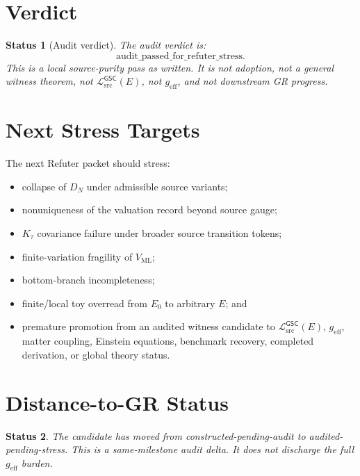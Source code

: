 \documentclass[11pt]{article}
\newcommand{\MetricData}{\mathcal{L}_{\mathrm{src}}^{\mathsf{GSC}}}
\newcommand{\geff}{g_{\mathrm{eff}}}
\newcommand{\Ezero}{E_{0}}
\newtheorem{status}{Status}
\begin{document}
\section{Verdict}

\begin{status}[Audit verdict]
The audit verdict is:
\[
  \mathrm{audit\_passed\_for\_refuter\_stress}.
\]
This is a local source-purity pass as written. It is not adoption, not a
general witness theorem, not \(\MetricData(E)\), not \(\geff\), and not
downstream GR progress.
\end{status}

\section{Next Stress Targets}

The next Refuter packet should stress:
\begin{itemize}[leftmargin=*]
  \item collapse of \(D_N\) under admissible source variants;
  \item nonuniqueness of the valuation record beyond source gauge;
  \item \(K_{\tau}\) covariance failure under broader source transition
  tokens;
  \item finite-variation fragility of \(V_{\mathrm{ML}}\);
  \item bottom-branch incompleteness;
  \item finite/local toy overread from \(\Ezero\) to arbitrary \(E\); and
  \item premature promotion from an audited witness candidate to
  \(\MetricData(E)\), \(\geff\), matter coupling, Einstein equations,
  benchmark recovery, completed derivation, or global theory status.
\end{itemize}

\section{Distance-to-GR Status}

\begin{status}
The candidate has moved from constructed-pending-audit to
audited-pending-stress. This is a same-milestone audit delta. It does not
discharge the full \(\geff\) burden.
\end{status}
\end{document}
